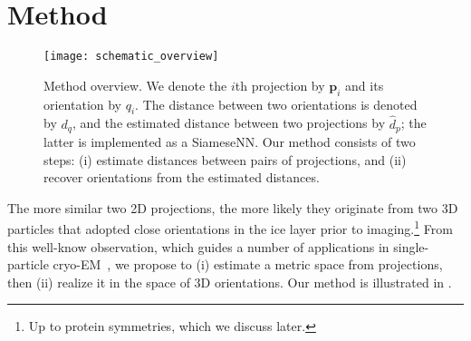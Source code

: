 \section{Method}

\begin{figure}
    \centering
    \texttt{[image: schematic\_overview]}
    \caption{
        Method overview.
        We denote the $i$th projection by $\mathbf{p}_i$ and its orientation by $q_i$. The distance between two orientations is denoted by $d_q$, and the estimated distance between two projections by $\widehat{d}_p$; the latter is implemented as a SiameseNN.
        Our method consists of two steps: (i) estimate distances between pairs of projections, and (ii) recover orientations from the estimated distances.
         
    }
    \label{fig:schematic:overview}
\end{figure}

The more similar two 2D projections, the more likely they originate from two 3D particles that adopted close orientations in the ice layer prior to imaging.\footnote{Up to protein symmetries, which we discuss later.}
From this well-know observation, which guides a number of applications in single-particle cryo-EM~\cite{frank2006three}, we propose to (i) estimate a metric space from projections, then (ii) realize it in the space of 3D orientations.
Our method is illustrated in .

 

